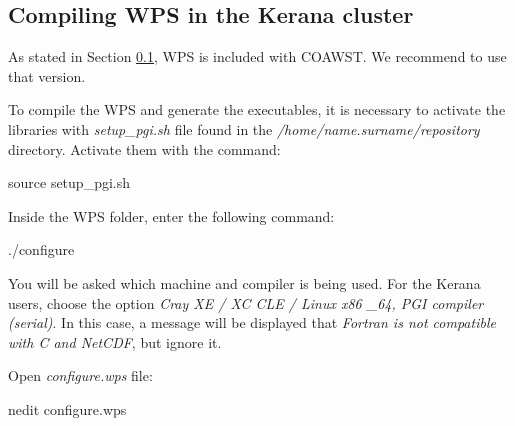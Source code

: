\subsection{Compiling WPS in the Kerana cluster}\label{wpsker}
\bigskip

\begin{tcolorbox}[enhanced,
    grow to left by=0cm,%
    grow to right by=0cm,%
    enlarge top by=0cm,%
    enlarge bottom by=0cm,%
    tcbox raise base,
    boxrule=1.0pt,
    left=18mm,
    colframe=red!50!black,coltext=red!25!black,colback=red!10!white,
    overlay={\begin{tcbclipinterior}\fill[red!75!blue!50!white] (frame.south west)
      rectangle node[text=white,font=\sffamily\bfseries\footnotesize,rotate=0] {WARNING} ([xshift=18mm]frame.north west);\end{tcbclipinterior}}]
      As stated in Section \textcolor{bleu_cite}{\ref{wpsker}}, WPS is included with COAWST. We recommend to use that version.
\end{tcolorbox}
\bigskip

 To compile the WPS and generate the executables, it is necessary to activate the libraries with \textit{setup\_pgi.sh} file
found in the \textit{/home/name.surname/repository} directory. Activate them with the command:
\bigskip

\begin{bashcode}
source setup_pgi.sh
\end{bashcode}
\bigskip

 Inside the WPS folder, enter the following command:
\bigskip

\begin{bashcode}
./configure
\end{bashcode}
\bigskip

 You will be asked which machine and compiler is being used. For the Kerana users, choose the option 
\textit{Cray XE / XC CLE / Linux x86 \_64, PGI compiler (serial)}. In this case, a message will be displayed that \textit{Fortran is not compatible 
with C and NetCDF}, but ignore it.
\bigskip

 Open \textit{configure.wps} file:
\bigskip

\begin{bashcode}
nedit configure.wps
\end{bashcode}
\bigskip

